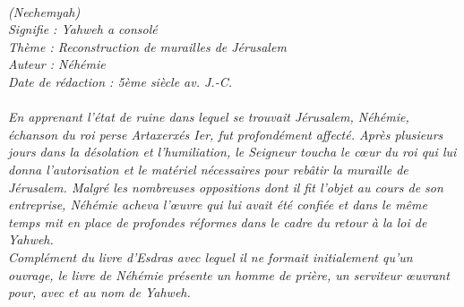 \BFont
\noindent\hrulefill
{\footnotesize
\textit{
\bigskip
{\centering{}
\\(Nechemyah)
\\Signifie : Yahweh a consolé
\\Thème : Reconstruction de murailles de Jérusalem
\\Auteur : Néhémie
\\Date de rédaction : 5ème siècle av. J.-C.\\}
}
\textit{
\\En apprenant l’état de ruine dans lequel se trouvait Jérusalem, Néhémie, échanson du roi perse Artaxerxés Ier, fut profondément affecté. Après plusieurs jours dans la désolation et l’humiliation, le Seigneur toucha le cœur du roi qui lui donna l’autorisation et le matériel nécessaires pour rebâtir la muraille de Jérusalem. Malgré les nombreuses oppositions dont il fit l’objet au cours de son entreprise, Néhémie acheva l’œuvre qui lui avait été confiée et dans le même temps mit en place de profondes réformes dans le cadre du retour à la loi de Yahweh.
\\Complément du livre d’Esdras avec lequel il ne formait initialement qu’un ouvrage, le livre de Néhémie présente un homme de prière, un serviteur œuvrant pour, avec et au nom de Yahweh.\bigskip
}
}
\par\nobreak\noindent\hrulefill
